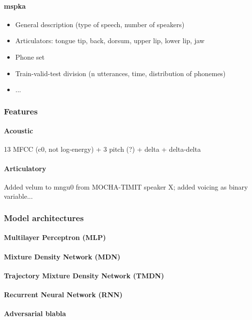 \paragraph{mspka}
\begin{itemize}
\item General description (type of speech, number of speakers)
\item Articulators: tongue {tip, back, dorsum}, upper lip, lower lip, jaw
\item Phone set
\item Train-valid-test division (n utterances, time, distribution of phonemes)
\item ...
\end{itemize}

\subsubsection{Features} 
\paragraph{Acoustic}
13 MFCC (c0, not log-energy) + 3 pitch (?) + delta + delta-delta
\paragraph{Articulatory}
{\color{red}Added velum to mngu0 from MOCHA-TIMIT speaker X; added voicing as binary variable...}

\subsubsection{Model architectures} 
\paragraph{Multilayer Perceptron (MLP)}
\paragraph{Mixture Density Network (MDN)}
\paragraph{Trajectory Mixture Density Network (TMDN)}
\paragraph{Recurrent Neural Network (RNN)}
\paragraph{Adversarial {\color{red}blabla}}

